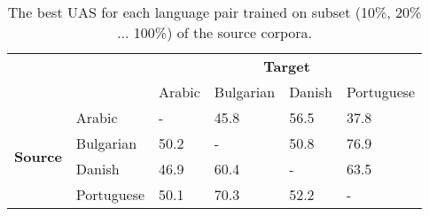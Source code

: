 \begin{table}
\centering
\begin{tabular}{llllll}
                        &            & \multicolumn{4}{c}{\textbf{Target}}               \\
                        &            & Arabic & Bulgarian & Danish & Portuguese \\
\multirow{4}{*}{\textbf{Source}} & Arabic     & -      & 45.8      & 56.5   & 37.8       \\
                        & Bulgarian  & 50.2   & -         & 50.8   & 76.9       \\
                        & Danish     & 46.9   & 60.4      & -      & 63.5       \\
                        & Portuguese & 50.1   & 70.3      & 52.2   & -         
\end{tabular}
\caption{The best UAS for each language pair trained on subset (10\%, 20\% ... 100\%) of the source corpora. }
\label{tab:sogaard11:eachlangpair}
\end{table}

